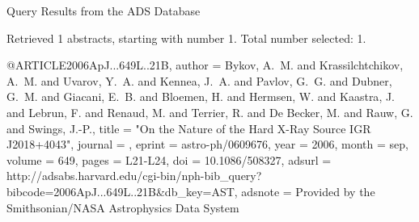 Query Results from the ADS Database


Retrieved 1 abstracts, starting with number 1.  Total number selected: 1.

@ARTICLE{2006ApJ...649L..21B,
   author = {{Bykov}, A.~M. and {Krassilchtchikov}, A.~M. and {Uvarov}, Y.~A. and 
	{Kennea}, J.~A. and {Pavlov}, G.~G. and {Dubner}, G.~M. and 
	{Giacani}, E.~B. and {Bloemen}, H. and {Hermsen}, W. and {Kaastra}, J. and 
	{Lebrun}, F. and {Renaud}, M. and {Terrier}, R. and {De Becker}, M. and 
	{Rauw}, G. and {Swings}, J.-P.},
    title = "{On the Nature of the Hard X-Ray Source IGR J2018+4043}",
  journal = {\apjl},
   eprint = {astro-ph/0609676},
     year = 2006,
    month = sep,
   volume = 649,
    pages = {L21-L24},
      doi = {10.1086/508327},
   adsurl = {http://adsabs.harvard.edu/cgi-bin/nph-bib_query?bibcode=2006ApJ...649L..21B&db_key=AST},
  adsnote = {Provided by the Smithsonian/NASA Astrophysics Data System}
}


